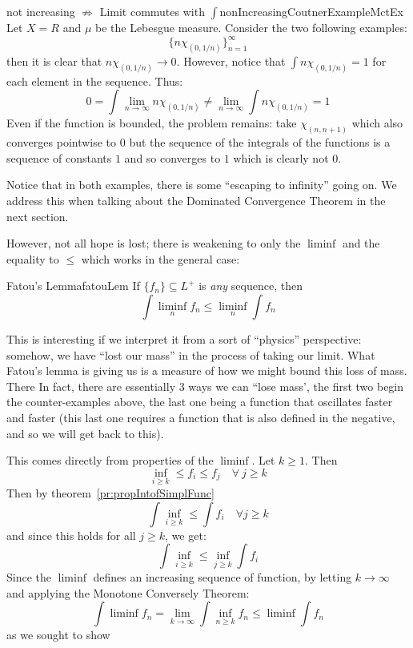 \documentclass[oneside]{book}
\newcommand{\sse}{\subseteq}
\newcommand{\rw}{\rightarrow}
\newcommand{\Rw}{\Rightarrow}
\begin{document}
\begin{example}{not increasing $\not\Rw$ Limit commutes with $\int$}{nonIncreasingCoutnerExampleMctEx}
	Let $X = R$ and $\mu$ be the Lebesgue measure. Consider the two following examples:
	\[
		\{n\chi_{(0, 1/n)}\}_{n=1}^\infty
	\]
	then it is clear that $n\chi_{(0, 1/n)} \rw 0$. However, notice that $\int n\chi_{(0, 1/n)} = 1$ for each element in
	the sequence. Thus:
	\[
		0 = \int \lim_{n \rw \infty} n\chi_{(0, 1/n)} \ne \lim_{n \rw \infty}\int n\chi_{(0, 1/n)} = 1
	\]
	Even if the function is bounded, the problem remains: take $\chi_{(n, n+1)}$ which also converges pointwise to $0$
	but the sequence of the integrals of the functions is a sequence of constants $1$ and so converges to $1$ which is
	clearly not $0$.

	Notice that in both examples, there is some ``escaping to infinity'' going on. We address this when talking about
	the Dominated Convergence Theorem in the next section. 
\end{example}


However, not all hope is lost; there is weakening to only the $\liminf$ and the equality to $\le$ which works in the
general case:

\begin{thm}{Fatou's Lemma}{fatouLem}
	If $\{f_n\} \sse L^+$ is \emph{any} sequence, then
	\[
		\int \liminf_n f_n \le \liminf_n \int f_n
	\]
\end{thm}

This is interesting if we interpret it from a sort of ``physics'' perspective: somehow, we have ``lost our mass'' in the
process of taking our limit. What Fatou's lemma is giving us is a measure of how we might bound this loss of mass. There
In fact, there are essentially 3 ways we can ``lose mass', the first two begin the counter-examples above, the last one
being a function that oscillates faster and faster (this last one requires a function that is also defined in the
negative, and so we will get back to this).

\begin{Proof}
	This comes directly from properties of the $\liminf$. Let $k \ge 1$. Then 
	\[
		\inf_{i \ge k} \le f_i \le f_j \quad \forall\ j \ge k
	\]
	Then by theorem~\ref{pr:propIntofSimplFunc}
	\[
		\int \inf_{i \ge k}\le \int f_i\quad \forall j \ge k
	\]
	and since this holds for all $j \ge k$, we get:
	\[
		\int \inf_{i \ge k}\le \inf_{j \ge k}\int f_i
	\]
	Since the $\liminf$ defines an increasing sequence of function, by letting $k \rw \infty$ and applying the Monotone
	Conversely Theorem:
	\[
		\int \liminf f_n = \lim_{k \rw \infty} \int \inf_{n \ge k} f_n \le \liminf \int f_n
	\]
	as we sought to show
\end{Proof}
\end{document}
